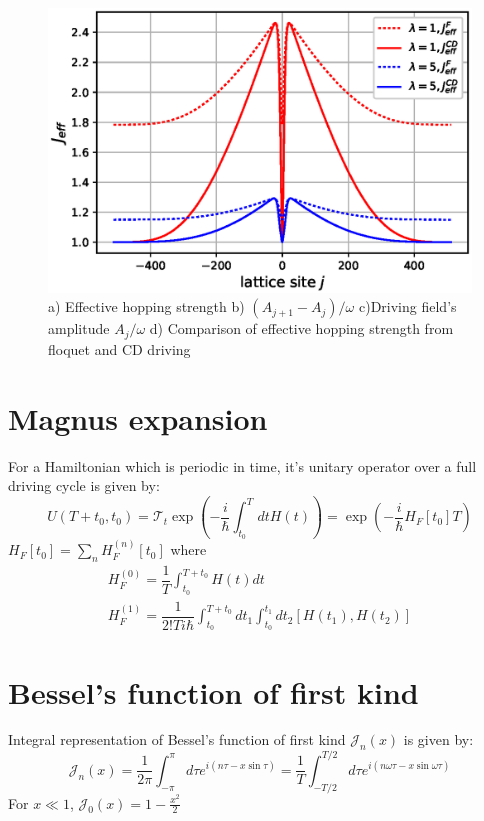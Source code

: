 \documentclass[11pt,a4paper]{article}
\begin{document}
\begin{figure}[!ht]
\begin{center}
\includegraphics[scale=0.5]{pics/j_eff_comp_eckart_potn.eps}
\caption{ a) Effective hopping strength b) $(A_{j+1}-A_{j})/\omega$ c)Driving field's amplitude $A_{j}/\omega$ d) Comparison of effective hopping strength from floquet and CD driving }
\end{center}
\end{figure}

\appendix 
\section{Magnus expansion}
For a Hamiltonian which is periodic in time, it's unitary operator over a full driving cycle is given by:
\begin{equation}
U(T+ t_0, t_0)= \mathcal{T}_t\exp(- \dfrac{i}{\hbar} \int_{t_0}^T dt H(t))= \exp(- \dfrac{i}{\hbar}  H_F[t_0]T)
\end{equation}
$ H_F[t_0]= \sum_n H_F^{(n)}[t_0] $ 
where 
\begin{align*}
H_F^{(0)}= \dfrac{1}{T} \int_{t_0}^{T+t_0} H(t) dt \\
H_F^{(1)}= \dfrac{1}{2! T i \hbar} \int_{t_0}^{T+t_0}  dt_1\int_{t_0}^{t_1} dt_2  [H(t_1), H(t_2)] 
\end{align*}


\section{Bessel's function of first kind}
Integral representation of Bessel's function of first kind $\mathcal{J}_n (x)$ is given by:
\begin{equation}
\mathcal{J}_n (x)=  \frac{1}{2 \pi} \int_{-\pi}^\pi d\tau e^{i(n \tau - x \sin \tau)}= \frac{1}{T} \int_{-T/2}^{T/2} d\tau e^{i(n   \omega \tau - x \sin \omega \tau)}
\end{equation}
For $x \ll1$, $\mathcal{J}_0 (x)= 1- \frac{x^2}{2}$
\end{document}
